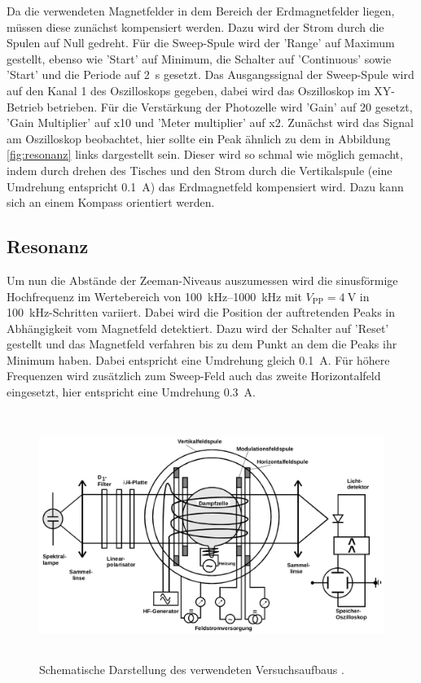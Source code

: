 Da die verwendeten Magnetfelder in dem Bereich der Erdmagnetfelder liegen, müssen diese zunächst kompensiert werden. Dazu wird der 
Strom durch die Spulen auf Null gedreht. Für die Sweep-Spule wird der 'Range' auf Maximum gestellt, ebenso wie 'Start' auf Minimum,
die Schalter auf 'Continuous' sowie 'Start' und die Periode auf \SI{2}{\second} gesetzt. Das Ausgangssignal der Sweep-Spule wird auf den 
Kanal 1 des Oszilloskops gegeben, dabei wird das Oszilloskop im XY-Betrieb betrieben. Für die Verstärkung der Photozelle wird 
'Gain' auf \num{20} gesetzt, 'Gain Multiplier' auf x\num{10} und 'Meter multiplier' auf x\num{2}.
Zunächst wird das Signal am Oszilloskop beobachtet, hier sollte ein Peak ähnlich zu dem in Abbildung \ref{fig:resonanz} links dargestellt 
sein. Dieser wird so schmal wie möglich gemacht, indem durch drehen des Tisches und den Strom durch die Vertikalspule (eine Umdrehung
entspricht \SI{0.1}{\ampere}) das Erdmagnetfeld kompensiert wird. Dazu kann sich an einem Kompass orientiert werden.

\subsection{Resonanz}
\label{sec:resonanz}
Um nun die Abstände der Zeeman-Niveaus auszumessen wird die sinusförmige Hochfrequenz im Wertebereich von \SIrange{100}{1000}{\kilo\hertz} 
mit $V_\text{PP} = \SI{4}{\volt}$ in \SI{100}{\kilo\hertz}-Schritten variiert.
Dabei wird die Position der auftretenden Peaks in Abhängigkeit vom Magnetfeld detektiert. Dazu wird der Schalter auf 'Reset' gestellt 
und das Magnetfeld verfahren bis zu dem Punkt an dem die Peaks ihr Minimum haben. Dabei entspricht eine Umdrehung gleich \SI{0.1}{\ampere}.
Für höhere Frequenzen wird zusätzlich zum Sweep-Feld auch das zweite Horizontalfeld eingesetzt, hier entspricht eine Umdrehung 
\SI{0.3}{\ampere}.

\begin{figure}
  \centering
  \includegraphics[height=8.0cm]{content/pictures/Aufbau.png}
  \caption{Schematische Darstellung des verwendeten Versuchsaufbaus \cite{anleitung}.}
  \label{fig:aufbau}
\end{figure}

\FloatBarrier